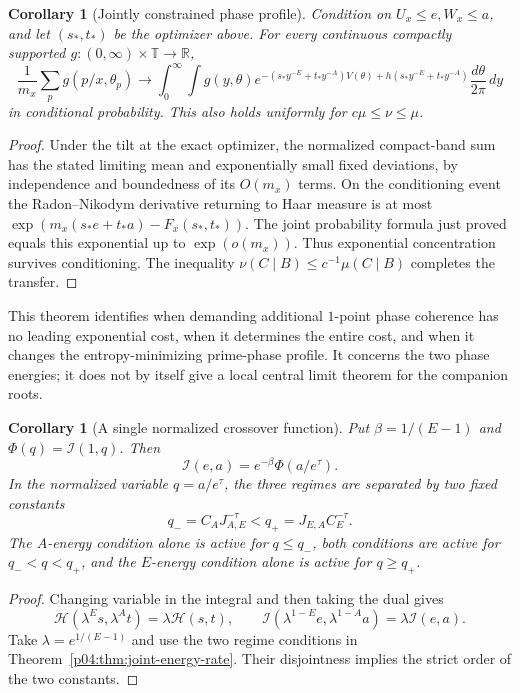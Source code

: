 \documentclass[11pt,letterpaper]{article}
\newtheorem{corollary}[theorem]{Corollary}
\theoremstyle{definition}
\theoremstyle{remark}
\newcommand{\1}{\mathbf 1}
\begin{document}
\begin{corollary}[Jointly constrained phase profile]
\label{p04:cor:joint-constrained-profile}
Condition on $U_x\le e,W_x\le a$, and let $(s_*,t_*)$ be the
optimizer above. For every continuous compactly supported
$g:(0,\infty)\times\mathbb T\to\mathbb R$,
\[
 \frac1{m_x}\sum_p g(p/x,\theta_p)
 \longrightarrow \int_0^\infty\int g(y,\theta)
 e^{-(s_*y^{-E}+t_*y^{-A})V(\theta)
       +h(s_*y^{-E}+t_*y^{-A})}\frac{d\theta}{2\pi}\,dy
\]
in conditional probability. This also holds uniformly for
$c\mu\le\nu\le\mu$.
\end{corollary}

\begin{proof}
Under the tilt at the exact optimizer, the normalized compact-band
sum has the stated limiting mean and exponentially small fixed
deviations, by independence and boundedness of its $O(m_x)$ terms.
On the conditioning event the Radon--Nikodym derivative returning
to Haar measure is at most
$\exp(m_x(s_*e+t_*a)-F_x(s_*,t_*))$.
The joint probability formula just proved equals this exponential
up to $\exp(o(m_x))$. Thus exponential concentration survives
conditioning. The inequality
$\nu(C\mid B)\le c^{-1}\mu(C\mid B)$ completes the transfer.
\end{proof}

This theorem identifies when demanding additional $1$-point phase
coherence has no leading exponential cost, when it determines the
entire cost, and when it changes the entropy-minimizing prime-phase
profile. It concerns the two phase energies; it does not by itself
give a local central limit theorem for the companion roots.


\begin{corollary}[A single normalized crossover function]
\label{p04:cor:joint-homogeneity}
Put $\beta=1/(E-1)$ and $\Phi(q)=\mathcal I(1,q)$. Then
\[
 \mathcal I(e,a)=e^{-\beta}\Phi(a/e^\tau).
\]
In the normalized variable $q=a/e^\tau$, the three regimes are
separated by two fixed constants
\[
 q_-=C_AJ_{A,E}^{-\tau}<q_+=J_{E,A}C_E^{-\tau}.
\]
The $A$-energy condition alone is active for $q\le q_-$, both
conditions are active for $q_-<q<q_+$, and the $E$-energy
condition alone is active for $q\ge q_+$.
\end{corollary}
\begin{proof}
Changing variable in the integral and then taking the dual gives
\[
 \mathcal H(\lambda^Es,\lambda^At)=\lambda\mathcal H(s,t),
 \qquad
 \mathcal I(\lambda^{1-E}e,\lambda^{1-A}a)
 =\lambda\mathcal I(e,a).
\]
Take $\lambda=e^{1/(E-1)}$ and use the two regime conditions
in Theorem~\ref{p04:thm:joint-energy-rate}. Their disjointness implies
the strict order of the two constants.
\end{proof}
\end{document}
